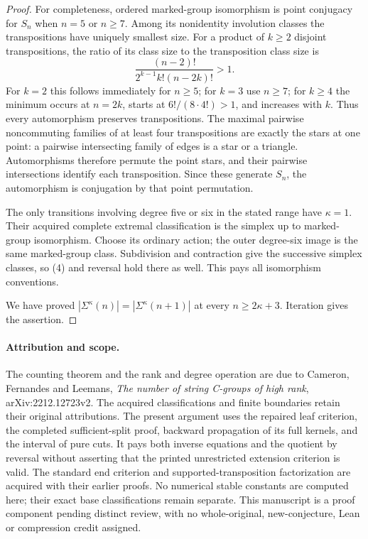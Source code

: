 \documentclass[11pt,a4paper]{article}
\begin{document}
\begin{proof}
For completeness, ordered marked-group isomorphism is point conjugacy
for $S_n$ when $n=5$ or $n\ge7$. Among its nonidentity involution
classes the transpositions have uniquely smallest size. For a product
of $k\ge2$ disjoint transpositions, the ratio of its class size to
the transposition class size is
\[
                  \frac{(n-2)!}{2^{k-1}k!(n-2k)!}>1.
\]
For $k=2$ this follows immediately for $n\ge5$; for $k=3$ use
$n\ge7$; for $k\ge4$ the minimum occurs at $n=2k$, starts at
$6!/(8\cdot4!)>1$, and increases with $k$. Thus every automorphism
preserves transpositions. The maximal pairwise noncommuting families
of at least four transpositions are exactly the stars at one point:
a pairwise intersecting family of edges is a star or a triangle.
Automorphisms therefore permute the point stars, and their pairwise
intersections identify each transposition. Since these generate $S_n$,
the automorphism is conjugation by that point permutation.

The only transitions involving degree five or six in the stated range
have $\kappa=1$. Their acquired complete extremal classification is
the simplex up to marked-group isomorphism. Choose its ordinary action;
the outer degree-six image is the same marked-group class. Subdivision
and contraction give the successive simplex classes, so (4) and reversal
hold there as well. This pays all isomorphism conventions.

We have proved $|\Sigma^\kappa(n)|=|\Sigma^\kappa(n+1)|$ at every
$n\ge2\kappa+3$. Iteration gives the assertion.
\end{proof}

\paragraph{Attribution and scope.}
The counting theorem and the rank and degree operation are due to
Cameron, Fernandes and Leemans, \emph{The number of string C-groups of
high rank}, arXiv:2212.12723v2. The acquired classifications and finite
boundaries retain their original attributions. The present argument
uses the repaired leaf criterion, the completed sufficient-split proof,
backward propagation of its full kernels, and the interval of pure cuts.
It pays both inverse equations and the quotient by reversal without
asserting that the printed unrestricted extension criterion is valid.
The standard end criterion and supported-transposition factorization
are acquired with their earlier proofs. No numerical stable constants
are computed here; their exact base classifications remain separate.
This manuscript is a proof component pending distinct review, with no
whole-original, new-conjecture, Lean or compression credit assigned.
\end{document}

